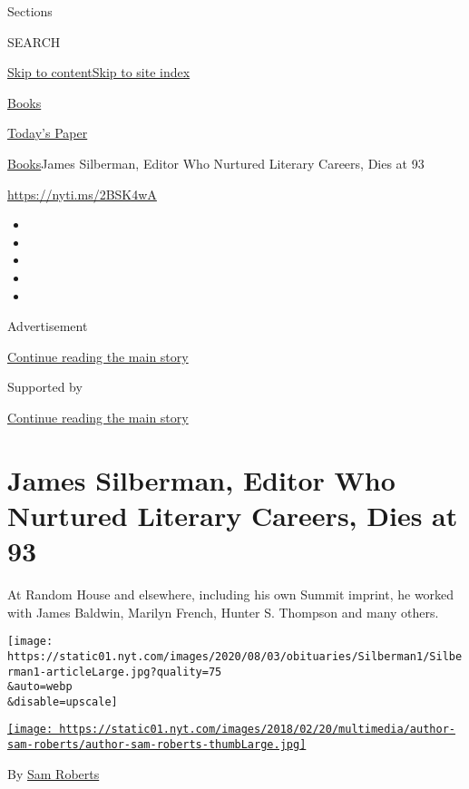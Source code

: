 Sections

SEARCH

\protect\hyperlink{site-content}{Skip to
content}\protect\hyperlink{site-index}{Skip to site index}

\href{https://www.nytimes.com/section/books}{Books}

\href{https://myaccount.nytimes.com/auth/login?response_type=cookie\&client_id=vi}{}

\href{https://www.nytimes.com/section/todayspaper}{Today's Paper}

\href{/section/books}{Books}\textbar{}James Silberman, Editor Who
Nurtured Literary Careers, Dies at 93

\url{https://nyti.ms/2BSK4wA}

\begin{itemize}
\item
\item
\item
\item
\item
\end{itemize}

Advertisement

\protect\hyperlink{after-top}{Continue reading the main story}

Supported by

\protect\hyperlink{after-sponsor}{Continue reading the main story}

\hypertarget{james-silberman-editor-who-nurtured-literary-careers-dies-at-93}{%
\section{James Silberman, Editor Who Nurtured Literary Careers, Dies at
93}\label{james-silberman-editor-who-nurtured-literary-careers-dies-at-93}}

At Random House and elsewhere, including his own Summit imprint, he
worked with James Baldwin, Marilyn French, Hunter S. Thompson and many
others.

\texttt{[image: https://static01.nyt.com/images/2020/08/03/obituaries/Silberman1/Silberman1-articleLarge.jpg?quality=75\\\&auto=webp\\\&disable=upscale]}

\href{https://www.nytimes.com/by/sam-roberts}{\texttt{[image: https://static01.nyt.com/images/2018/02/20/multimedia/author-sam-roberts/author-sam-roberts-thumbLarge.jpg]}}

By \href{https://www.nytimes.com/by/sam-roberts}{Sam Roberts}

